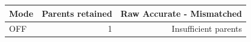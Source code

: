 \begin{tabular}{lrr}
\toprule
Mode & Parents retained & Raw Accurate - Mismatched \\
\midrule
OFF & 1 & Insufficient parents \\
\bottomrule
\end{tabular}
